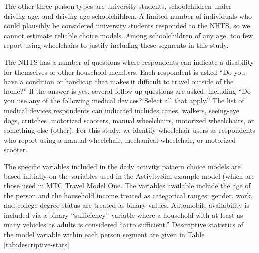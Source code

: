 \documentclass[3p, authoryear, review]{elsarticle} %
\begin{document}
The other three person types are university students, schoolchildren under
driving age, and driving-age schoolchildren. A limited number of individuals who
could plausibly be considered university students responded to the NHTS, so we
cannot estimate reliable choice models. Among schoolchildren of any age, too few
report using wheelchairs to justify including these segments in this study.

The NHTS has a number of questions where respondents can indicate a disability
for themselves or other household members. Each respondent is asked ``Do you
have a condition or handicap that makes it difficult to travel outside of the
home?'' If the answer is yes, several follow-up questions are asked, including
``Do you use any of the following medical devices? Select all that apply.'' The
list of medical devices respondents can indicated includes canes, walkers,
seeing-eye dogs, crutches, motorized scooters, manual wheelchairs,
motorized wheelchairs, or something else (other).
For this study, we identify wheelchair users as respondents who report using a
manual wheelchair, mechanical wheelchair, or motorized scooter.

The specific variables included in the daily activity pattern choice models
are based initially on the variables used in the ActivitySim example model (which are
those used in MTC Travel Model One. The variables available include the age of
the person and the household income treated as categorical ranges; gender, work,
and college degree status are treated as binary values. Automobile availability is
included via a binary ``sufficiency'' variable where a household with at least as
many vehicles as adults is considered ``auto sufficient.'' Descriptive statistics
of the model variable within each person segment are given in
Table \ref{tab:descriptive-stats}
\end{document}
